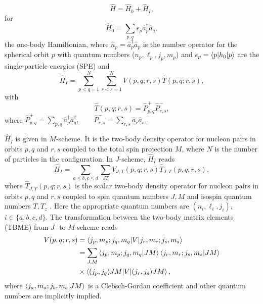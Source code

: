 \documentclass[aps,prl,reprint,groupedaddress]{revtex4-1}  %
\begin{document}
		\begin{equation} \label{eq:H}
		\hat H = \hat H_0 + \hat H_I,
		\end{equation}
for
		\begin{equation} \label{eq:H_0}
		\hat H_0 = \sum_{p,q} \epsilon_p \hat a_{p}^\dagger \hat a_{q},
		\end{equation}
the one-body Hamiltonian, where $\hat n_p = \hat a_p^\dagger \hat a_p$ is the number operator for the spherical orbit $p$ with quantum numbers ($n_p,\ell_p,j_p,m_p$) and $\epsilon_p = \braket{p|h_0|p}$ are the single-particle energies (SPE) and
		\begin{equation} \label{eq:V}
		\hat H_I = \sum_{p < q=1}^{N} \sum_{r < s=1}^{N} V(p,q;r,s) \hat T(p,q;r,s),
		\end{equation}
		with
		\begin{equation} \label{eq:P}
		\hat T(p,q;r,s)  = \hat P_{p,q}^+ \hat P_{r,s}^-,
		\end{equation}
where $\hat P_{p,q}^+ = \sum_{p,q} \hat a_p^\dagger \hat a_q^\dagger, \qquad
								  \hat P_{r,s}^- = \sum_{r,s} \hat a_r \hat a_s.$

$\hat H_I$ is given in $M$-scheme. It is the two-body density operator for nucleon pairs in orbits $p,q$ and $r,s$ coupled to the total spin projection $M$, where $N$ is the number of particles in the configuration. In $J$-scheme, $\hat H_I$ reads 
\begin{equation}
	\hat H_I =  \sum_{a\leq b,c \leq d} \sum_{JT} V_{J,T}(p,q;r,s) \hat T_{J,T}(p,q;r,s),
\end{equation}
where $\hat T_{J,T}(p,q;r,s)$ is the scalar two-body density operator for nucleon pairs in orbits $p,q$ and $r,s$ coupled to spin quantum numbers $J,M$ and isospin quantum numbers $T,T_z$ \cite{Brown2006}. Here the appropriate quantum numbers are $(n_i,\ell_i,j_i)$, $i \in \{a,b,c,d\}$. The transformation between the two-body matrix elements (TBME) from $J$- to $M$-scheme reads
\begin{align}
	\nonumber
	V(p,q;r,s) & =  \braket{j_{p},m_{p};j_{q},m_{q}|V|j_{r},m_{r};j_{s},m_{s}} \\ \nonumber
			   & =  \sum_{J,M} \braket{j_{p},m_{p};j_{q},m_{q}|JM} \braket{j_{r},m_{r};j_{s},m_{s}|JM} \\
			   &	\times \braket{(j_{p},j_{q})JM|V|(j_{r},j_{s})JM},
\end{align}
where $\braket{j_{a},m_{a};j_{b},m_{b}|JM}$ is a Clebsch-Gordan coefficient and other quantum numbers are implicitly implied.
\end{document}
